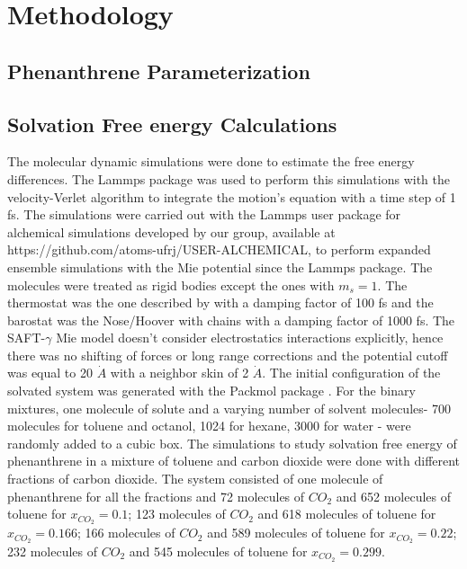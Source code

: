 \chapter{Methodology} %

\label{Chapter4} %

\section{Phenanthrene Parameterization}

\section{Solvation Free energy Calculations}
The molecular dynamic simulations were done to estimate the free energy differences. The Lammps package \cite{lammps}  was used to perform this simulations with the velocity-Verlet algorithm \cite{verlet} to integrate the motion's equation with a time step of 1 fs. The simulations were carried out with the Lammps user package for alchemical simulations developed by our group, available at https://github.com/atoms-ufrj/USER-ALCHEMICAL, to perform expanded ensemble simulations with the Mie potential since the Lammps package. The molecules were treated as rigid bodies except the ones with $m_{s}=1$. The thermostat was the one described by  with a damping factor of 100 fs and the barostat was the Nose/Hoover with chains with a damping factor of 1000 fs. The SAFT-$\gamma$ Mie model doesn't consider electrostatics interactions explicitly, hence there was no shifting of forces or long range corrections and the potential cutoff was equal to 20 $\dot{A}$ with a neighbor skin of 2 $\dot{A}$. The initial configuration of the  solvated system was generated with the Packmol package \cite{packmol} . For the binary mixtures, one molecule of solute and a varying number of solvent molecules- 700 molecules for toluene and octanol, 1024 for hexane, 3000 for water - were randomly added to a cubic box. The simulations to study solvation free energy of phenanthrene in a mixture of toluene and carbon dioxide were done with different fractions of carbon dioxide. The system consisted of one molecule of phenanthrene for all the fractions and  72 molecules of $CO_{2}$ and 652 molecules of toluene for $x_{CO_{2}} = 0.1$; 123 molecules of $CO_{2}$ and 618 molecules of toluene for $x_{CO_{2}} = 0.166$; 166 molecules of $CO_{2}$ and 589 molecules of toluene for $x_{CO_{2}} = 0.22$; 232 molecules of $CO_{2}$ and 545 molecules of toluene for $x_{CO_{2}} = 0.299$.
